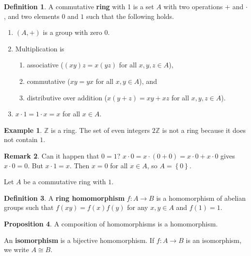 \documentclass{article}
\newcommand{\Z}{\mathbb{Z}}
\newcommand{\rb}[1]{\left( #1 \right)}
\newcommand{\cb}[1]{\left\{ #1 \right\}}
\theoremstyle{definition}\newtheorem{definition}{Definition}[section]
\theoremstyle{definition}\newtheorem{remark}[definition]{Remark}
\theoremstyle{definition}\newtheorem*{example}{Example}
\theoremstyle{definition}\newtheorem*{note}{Note}
\newtheorem{proposition}[definition]{Proposition}
\begin{document}
\begin{definition}
A commutative \textbf{ring} with 1 is a set $ A $ with two operations $ + $ and $ \cdot $, and two elements $ 0 $ and $ 1 $ such that the following holds.
\begin{enumerate}
\item $ \rb{A, +} $ is a group with zero $ 0 $.
\item Multiplication is
\begin{enumerate}
\item associative ($ \rb{xy}z = x\rb{yz} $ for all $ x, y, z \in A $),
\item commutative ($ xy = yx $ for all $ x, y \in A $), and
\item distributive over addition ($ x\rb{y + z} = xy + xz $ for all $ x, y, z \in A $).
\end{enumerate}
\item $ x \cdot 1 = 1 \cdot x = x $ for all $ x \in A $.
\end{enumerate}
\end{definition}

\begin{example}
$ \Z $ is a ring. The set of even integers $ 2\Z $ is not a ring because it does not contain $ 1 $.
\end{example}

\begin{remark}
Can it happen that $ 0 = 1 $? $ x \cdot 0 = x \cdot \rb{0 + 0} = x \cdot 0 + x \cdot 0 $ gives $ x \cdot 0 = 0 $. But $ x \cdot 1 = x $. Then $ x = 0 $ for all $ x \in A $, so $ A = \cb{0} $.
\end{remark}

Let $ A $ be a commutative ring with $ 1 $.

\begin{definition}
A \textbf{ring homomorphism} $ f : A \to B $ is a homomorphism of abelian groups such that $ f\rb{xy} = f\rb{x}f\rb{y} $ for any $ x, y \in A $ and $ f\rb{1} = 1 $.
\end{definition}

\begin{proposition}
A composition of homomorphisms is a homomorphism.
\end{proposition}

An \textbf{isomorphism} is a bijective homomorphism. If $ f : A \to B $ is an isomorphism, we write $ A \cong B $.

\end{document}
